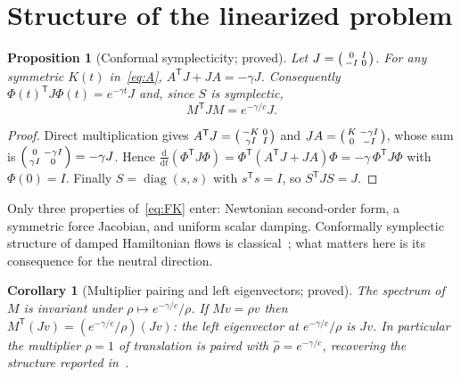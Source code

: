 \documentclass[11pt]{article}
\theoremstyle{plain}
\newtheorem{proposition}[theorem]{Proposition}
\newtheorem{corollary}[theorem]{Corollary}
\theoremstyle{definition}
\theoremstyle{remark}
\newcommand{\dd}{\mathrm{d}}
\newcommand{\T}{\mathsf T}
\newcommand{\tagP}{\textsf{proved}}
\begin{document}
\section{Structure of the linearized problem}\label{sec:structure}

\begin{proposition}[Conformal symplecticity; \tagP]\label{prop:cs}
Let $J=\begin{psmallmatrix}0&I\\-I&0\end{psmallmatrix}$. For any symmetric $K(t)$ in~\eqref{eq:A},
$A^{\T}J+JA=-\gamma J$. Consequently $\Phi(t)^{\T}J\Phi(t)=e^{-\gamma t}J$ and, since $S$ is
symplectic,
\begin{equation}\label{eq:cs}
  M^{\T}JM=e^{-\gamma/c}J .
\end{equation}
\end{proposition}

\begin{proof}
Direct multiplication gives $A^{\T}J=\begin{psmallmatrix}-K&0\\ \gamma I&I\end{psmallmatrix}$ and
$JA=\begin{psmallmatrix}K&-\gamma I\\0&-I\end{psmallmatrix}$, whose sum is
$\begin{psmallmatrix}0&-\gamma I\\ \gamma I&0\end{psmallmatrix}=-\gamma J$. Hence
$\frac{\dd}{\dd t}(\Phi^{\T}J\Phi)=\Phi^{\T}(A^{\T}J+JA)\Phi=-\gamma\,\Phi^{\T}J\Phi$ with
$\Phi(0)=I$. Finally $S=\operatorname{diag}(s,s)$ with $s^{\T}s=I$, so $S^{\T}JS=J$.
\end{proof}

Only three properties of~\eqref{eq:FK} enter: Newtonian second-order form, a symmetric
force Jacobian, and uniform scalar damping. Conformally symplectic structure of damped
Hamiltonian flows is classical~\cite{McLP01}; what matters here is its consequence for
the neutral direction.

\begin{corollary}[Multiplier pairing and left eigenvectors; \tagP]\label{cor:pairing}
The spectrum of $M$ is invariant under $\rho\mapsto e^{-\gamma/c}/\rho$. If $Mv=\rho v$ then
$M^{\T}(Jv)=(e^{-\gamma/c}/\rho)(Jv)$: the left eigenvector at $e^{-\gamma/c}/\rho$ is $Jv$.
In particular the multiplier $\rho=1$ of translation is paired with $\hat\rho=e^{-\gamma/c}$,
recovering the structure reported in~\cite{VCKX20,WvZSO96}.
\end{corollary}
\end{document}
